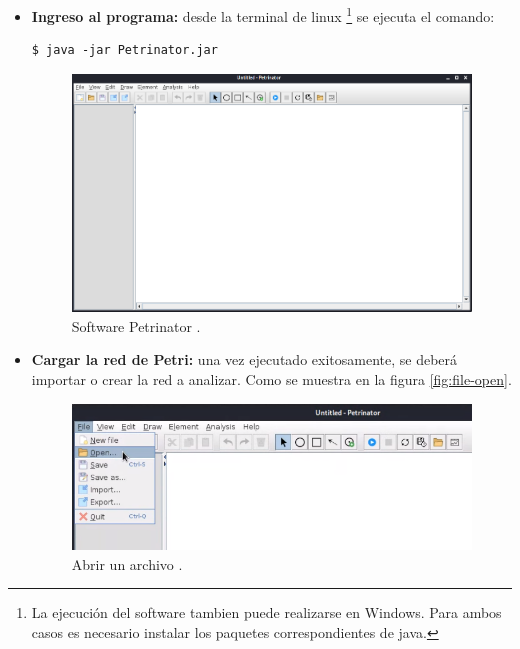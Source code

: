 \begin{itemize}   
    \item  \textbf{Ingreso al programa:}
    desde la terminal de linux \footnote{La ejecución del software tambien puede realizarse en Windows. Para ambos casos es necesario instalar los paquetes correspondientes de java.} se ejecuta el comando: 
    \begin{lstlisting}[language=SHELXL]
    		$ java -jar Petrinator.jar
    \end{lstlisting}
    
    \begin{figure} [H]
        \centering
        \includegraphics[width=\textwidth]{Figures/petrinator/petrinator-init.png}
        \caption{Software Petrinator .}
        \label{fig:pet-init}
    \end{figure}
   
    \item \textbf{Cargar la red de Petri:} una vez ejecutado exitosamente, se deberá importar o crear la red a analizar. Como se muestra en la figura \ref{fig:file-open}.
    
	\begin{figure} [H]
        \centering
        \includegraphics[scale=0.72]{Figures/petrinator/open2.png}
        \caption{Abrir un archivo .}
        \label{fig:pet-open}
    \end{figure} 
    

\end{itemize}
